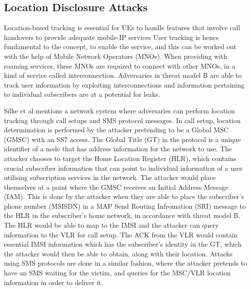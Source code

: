\documentclass[sigconf,nonacm]{acmart}
\begin{document}
\subsection{Location Disclosure Attacks} Location-based tracking is essential for UEs to handle features that involve call handovers to provide adequate mobile-IP services User tracking is hence fundamental to the concept, to enable the service, and this can be worked out with the help of Mobile Network Operators (MNOs). When providing with roaming services, these MNOs are required to connect with other MNOs, in a kind of service called interconnection. Adversaries in threat model B are able to track user information by exploiting interconnections and information pertaining to individual subscribers are at a potential for leaks. 

Silke et al \cite{teen} mentions a network system where adversaries can perform location tracking through call setups and SMS protocol messages. In call setup, location determination is performed by the attacker pretending to be a Global MSC (GMSC) with an SS7 access. The Global Title (GT) in the protocol is a unique identifier of a node that has address information for the network to use. The attacker chooses to target the Home Location Register (HLR), which contains crucial subscriber information that can point to individual information of a user utilising subscription services in the network. The attacker would place themselves at a point where the GMSC receives an Initial Address Message (IAM). This is done by the attacker when they are able to place the subscriber’s phone number (MSISDN) in a MAP Send Routing Infromation (SRI) message to the HLR in the subscriber’s home network, in accordance with threat model B. The HLR would be able to map to the IMSI and the attacker can query information to the VLR for call setup. The ACK from the VLR would contain essential IMSI information which has the subscriber’s identity in the GT, which the attacker would then be able to obtain, along with their location. Attacks using SMS protocols are done in a similar fashion, where the attacker pretends to have an SMS waiting for the victim, and queries for the MSC/VLR location information in order to deliver it.
\end{document}
